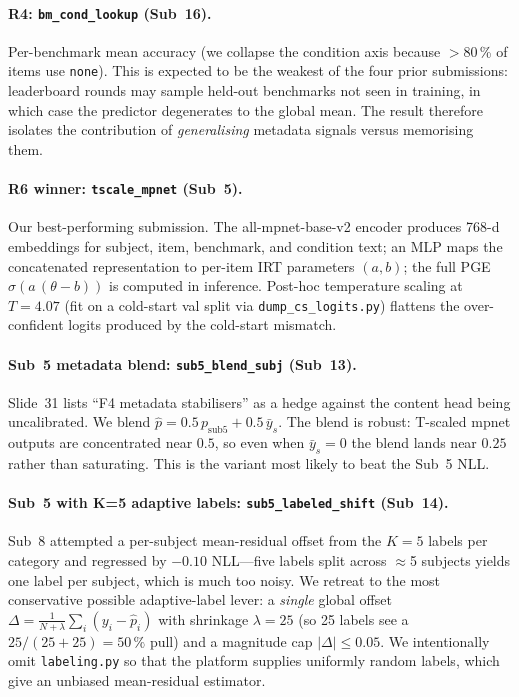 \paragraph{R4: \texttt{bm\_cond\_lookup} (Sub~16).}
Per-benchmark mean accuracy (we collapse the condition axis because
$>$80\,\% of items use \texttt{none}). This is expected to be the
weakest of the four prior submissions: leaderboard rounds may sample
held-out benchmarks not seen in training, in which case the
predictor degenerates to the global mean. The result therefore
isolates the contribution of \emph{generalising} metadata signals
versus memorising them.

\paragraph{R6 winner: \texttt{tscale\_mpnet} (Sub~5).}
Our best-performing submission. The all-mpnet-base-v2 encoder
produces 768-d embeddings for subject, item, benchmark, and
condition text; an MLP maps the concatenated representation to
per-item IRT parameters $(a, b)$; the full PGE
$\sigma(a\,(\theta - b))$ is computed in inference. Post-hoc
temperature scaling at $T{=}4.07$ (fit on a cold-start val split via
\texttt{dump\_cs\_logits.py}) flattens the over-confident logits
produced by the cold-start mismatch.

\paragraph{Sub~5 metadata blend: \texttt{sub5\_blend\_subj} (Sub~13).}
Slide~31 lists ``F4 metadata stabilisers'' as a hedge against the
content head being uncalibrated. We blend
$\hat p = 0.5\,p_{\text{sub5}} + 0.5\,\bar y_s$. The blend is
robust: T-scaled mpnet outputs are concentrated near $0.5$, so even
when $\bar y_s = 0$ the blend lands near $0.25$ rather than
saturating. This is the variant most likely to beat the Sub~5 NLL.

\paragraph{Sub~5 with K{=}5 adaptive labels: \texttt{sub5\_labeled\_shift} (Sub~14).}
Sub~8 attempted a per-subject mean-residual offset from the $K{=}5$
labels per category and regressed by $-0.10$ NLL—five labels split
across $\approx$5 subjects yields one label per subject, which is
much too noisy. We retreat to the most conservative possible
adaptive-label lever: a \emph{single} global offset
$\Delta = \frac{1}{N+\lambda}\sum_i (y_i - \hat p_i)$ with shrinkage
$\lambda{=}25$ (so 25 labels see a $25/(25{+}25) = 50\,\%$ pull) and a
magnitude cap $|\Delta| \le 0.05$. We intentionally omit
\texttt{labeling.py} so that the platform supplies uniformly random
labels, which give an unbiased mean-residual estimator.

